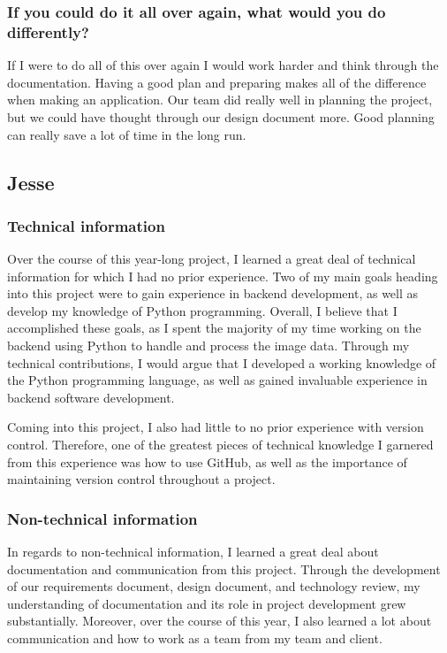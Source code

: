 \documentclass[onecolumn, draftclsnofoot,10pt, compsoc]{IEEEtran}
\begin{document}
\begin{flushleft}
\subsubsection{If you could do it all over again, what would you do differently?}
 If I were to do all of this over again I would work harder and think through the documentation. Having a good plan and preparing makes all of the difference when making an application. Our team did really well in planning the project, but we could have thought through our design document more. Good planning can really save a lot of time in the long run.
 
\subsection{Jesse}
\subsubsection{Technical information}
Over the course of this year-long project, I learned a great deal of technical information for which I had no prior experience. Two of my main goals heading into this project were to gain experience in backend development, as well as develop my knowledge of Python programming. Overall, I believe that I accomplished these goals, as I spent the majority of my time working on the backend using Python to handle and process the image data. Through my technical contributions, I would argue that I developed a working knowledge of the Python programming language, as well as gained invaluable experience in backend software development.
 
 
Coming into this project, I also had little to no prior experience with version control. Therefore, one of the greatest pieces of technical knowledge I garnered from this experience was how to use GitHub, as well as the importance of maintaining version control throughout a project.
 
\subsubsection{Non-technical information}
In regards to non-technical information, I learned a great deal about documentation and communication from this project. Through the development of our requirements document, design document, and technology review, my understanding of documentation and its role in project development grew substantially. Moreover, over the course of this year, I also learned a lot about communication and how to work as a team from my team and client.
 

\end{flushleft}
\end{document}
